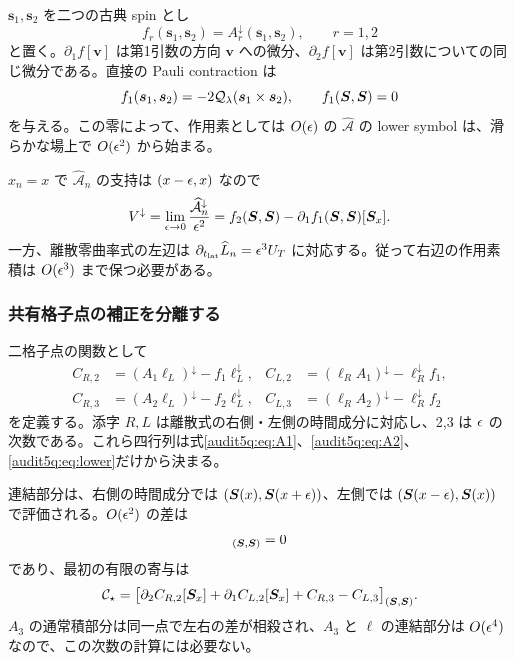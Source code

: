 $\bm s_1,\bm s_2$ を二つの古典 spin とし
\begin{equation}
f_r(\bm s_1,\bm s_2)=A_r^{\downarrow}(\bm s_1,\bm s_2),\qquad r=1,2
\end{equation}
と置く。$\partial_1 f[\bm v]$ は第1引数の方向 $\bm v$ への微分、$\partial_2 f[\bm v]$ は第2引数についての同じ微分である。直接の Pauli contraction は
\begin{equation}
f_1(\bm s_1,\bm s_2)=-2\mathcal Q_{\lambda}(\bm s_1\times\bm s_2),\qquad
f_1(\boldsymbol S,\boldsymbol S)=0
\label{audit5q:eq:f1}
\end{equation}
を与える。この零によって、作用素としては $O(\epsilon)$ の $\widehat{\mathcal A}$ の lower symbol は、滑らかな場上で $O(\epsilon^2)$ から始まる。

$x_n=x$ で $\widehat{\mathcal A}_n$ の支持は $(x-\epsilon,x)$ なので
\begin{equation}
V^{\downarrow}=\lim_{\epsilon\to0}\frac{\widehat{\mathcal A}_n^{\downarrow}}{\epsilon^2}
=f_2(\boldsymbol S,\boldsymbol S)-\partial_1f_1(\boldsymbol S,\boldsymbol S)[\boldsymbol S_x].
\label{audit5q:eq:Vdown}
\end{equation}
一方、離散零曲率式の左辺は $\partial_{t_{\rm lat}}\widehat L_n=\epsilon^3U_T$ に対応する。従って右辺の作用素積は $O(\epsilon^3)$ まで保つ必要がある。

\subsubsection{共有格子点の補正を分離する}

二格子点の関数として
\begin{align}
C_{R,2}&=(A_1\ell_L)^{\downarrow}-f_1\ell_L^{\downarrow},&
C_{L,2}&=(\ell_RA_1)^{\downarrow}-\ell_R^{\downarrow}f_1,\label{audit5q:eq:C2def}\\
C_{R,3}&=(A_2\ell_L)^{\downarrow}-f_2\ell_L^{\downarrow},&
C_{L,3}&=(\ell_RA_2)^{\downarrow}-\ell_R^{\downarrow}f_2
\label{audit5q:eq:C3def}
\end{align}
を定義する。添字 $R,L$ は離散式の右側・左側の時間成分に対応し、2,3 は $\epsilon$ の次数である。これら四行列は式\eqref{audit5q:eq:A1}、\eqref{audit5q:eq:A2}、\eqref{audit5q:eq:lower}だけから決まる。

連結部分は、右側の時間成分では $(\boldsymbol S(x),\boldsymbol S(x+\epsilon))$、左側では $(\boldsymbol S(x-\epsilon),\boldsymbol S(x))$ で評価される。$O(\epsilon^2)$ の差は
\begin{equation}
[C_{R,2}-C_{L,2}]_{(\bs,\bs)}=0
\end{equation}
であり、最初の有限の寄与は
\begin{equation}
\mathcal C_{\star}=\bigl[
\partial_2 C_{R,2}[\boldsymbol S_x]+\partial_1 C_{L,2}[\boldsymbol S_x]
+C_{R,3}-C_{L,3}
\bigr]_{(\boldsymbol S,\boldsymbol S)}.
\label{audit5q:eq:Cfromquantum}
\end{equation}
$A_3$ の通常積部分は同一点で左右の差が相殺され、$A_3$ と $\ell$ の連結部分は $O(\epsilon^4)$ なので、この次数の計算には必要ない。


